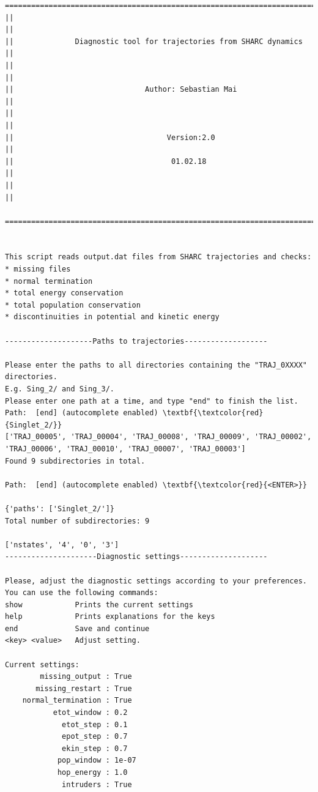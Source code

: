 \documentclass[a4paper,11pt,DIV=15,openany]{scrbook}
\begin{document}
\begin{oframed}
\footnotesize\begin{Verbatim}[commandchars=\\\{\}]
  ================================================================================
||                                                                                ||
||              Diagnostic tool for trajectories from SHARC dynamics              ||
||                                                                                ||
||                              Author: Sebastian Mai                             ||
||                                                                                ||
||                                   Version:2.0                                  ||
||                                    01.02.18                                    ||
||                                                                                ||
  ================================================================================


This script reads output.dat files from SHARC trajectories and checks:
* missing files
* normal termination
* total energy conservation
* total population conservation
* discontinuities in potential and kinetic energy
  
--------------------Paths to trajectories-------------------

Please enter the paths to all directories containing the "TRAJ_0XXXX" directories.
E.g. Sing_2/ and Sing_3/. 
Please enter one path at a time, and type "end" to finish the list.
Path:  [end] (autocomplete enabled) \textbf{\textcolor{red}{Singlet_2/}}
['TRAJ_00005', 'TRAJ_00004', 'TRAJ_00008', 'TRAJ_00009', 'TRAJ_00002', 
'TRAJ_00006', 'TRAJ_00010', 'TRAJ_00007', 'TRAJ_00003']
Found 9 subdirectories in total.

Path:  [end] (autocomplete enabled) \textbf{\textcolor{red}{<ENTER>}}

{'paths': ['Singlet_2/']}
Total number of subdirectories: 9

['nstates', '4', '0', '3']
---------------------Diagnostic settings--------------------

Please, adjust the diagnostic settings according to your preferences.
You can use the following commands:
show            Prints the current settings
help            Prints explanations for the keys
end             Save and continue
<key> <value>   Adjust setting.

Current settings:
        missing_output : True
       missing_restart : True
    normal_termination : True
           etot_window : 0.2
             etot_step : 0.1
             epot_step : 0.7
             ekin_step : 0.7
            pop_window : 1e-07
            hop_energy : 1.0
             intruders : True


\end{Verbatim}
\end{oframed}
\end{document}
